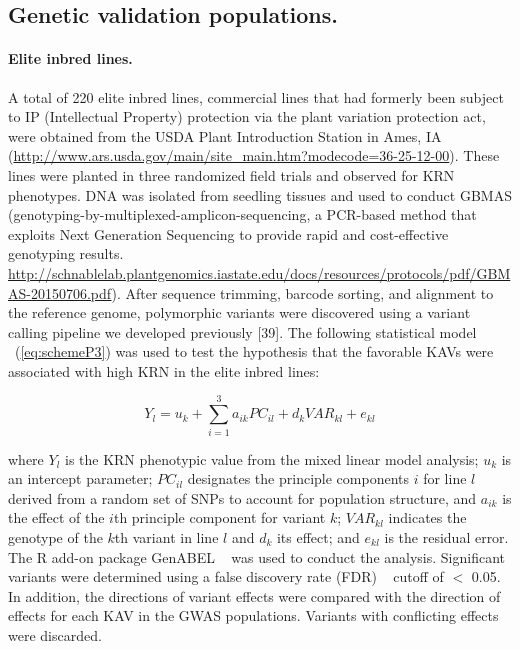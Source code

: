 \documentclass[10pt,letterpaper]{article}
\begin{document}
\subsection*{Genetic validation populations.} 
\paragraph{Elite inbred lines.}

A total of 220 elite inbred lines, commercial lines that had formerly been subject to IP (Intellectual Property) protection via the plant variation protection act, were obtained from the USDA Plant Introduction Station in Ames, IA (\url{http://www.ars.usda.gov/main/site_main.htm?modecode=36-25-12-00}). These lines were planted in three randomized field trials and observed for KRN phenotypes. DNA was isolated from seedling tissues and used to conduct GBMAS (genotyping-by-multiplexed-amplicon-sequencing, a PCR-based method that exploits Next Generation Sequencing to provide rapid and cost-effective genotyping results. \url{http://schnablelab.plantgenomics.iastate.edu/docs/resources/protocols/pdf/GBMAS-20150706.pdf}). After sequence trimming, barcode sorting, and alignment to the reference genome, polymorphic variants were discovered using a variant calling pipeline we developed previously [39].
The following statistical model ~(\ref{eq:schemeP3}) was used to test the hypothesis that the favorable KAVs were associated with high KRN in the elite inbred lines:

\begin{equation}\label{eq:schemeP3} 
Y_l = u_k + \sum_{i=1}^3 a_{ik}PC_{il} + d_kVAR_{kl} + e_{kl}
\end{equation}

where $Y_l$ is the KRN phenotypic value from the mixed linear model analysis; $u_k$ is an intercept parameter; $PC_{il}$ designates the principle components $i$ for line $l$ derived from a random set of SNPs to account for population structure, and $a_{ik}$ is the effect of the $i$th principle component for variant $k$; $VAR_{kl}$ indicates the genotype of the $k$th variant in line $l$ and $d_k$ its effect; and $e_{kl}$ is the residual error. The R add-on package GenABEL ~\cite{Aulchenko2007} was used to conduct the analysis. Significant variants were determined using a false discovery rate (FDR) ~\cite{Benjamini1995} cutoff of $<$ 0.05. In addition, the directions of variant effects were compared with the direction of effects for each KAV in the GWAS populations. Variants with conflicting effects were discarded. 
\end{document}
